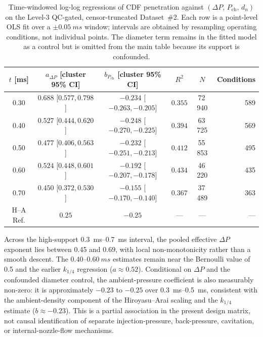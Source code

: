 \begin{table}[!ht]
\centering
\footnotesize
\setlength{\tabcolsep}{4pt}
\begin{tabular}{@{}ccccc r@{}}
\toprule
$t$ [ms] & $a_{\Delta P}$ [cluster 95\% CI] & $b_{P_{\mathrm{ch}}}$ [cluster 95\% CI] & $R^2$ & $N$ & Conditions \\
\midrule
0.30 & $0.688$ [$0.577,0.798$] & $-0.234$ [$-0.263,-0.205$] & $0.355$ & 72\,940 & 589 \\
0.40 & $0.527$ [$0.444,0.620$] & $-0.248$ [$-0.270,-0.225$] & $0.394$ & 63\,725 & 569 \\
0.50 & $0.477$ [$0.406,0.563$] & $-0.232$ [$-0.251,-0.213$] & $0.412$ & 55\,853 & 495 \\
0.60 & $0.524$ [$0.448,0.601$] & $-0.192$ [$-0.207,-0.178$] & $0.434$ & 46\,220 & 435 \\
0.70 & $0.450$ [$0.372,0.530$] & $-0.155$ [$-0.170,-0.140$] & $0.367$ & 37\,489 & 363 \\
\midrule
H--A Ref. & $0.25$ & $-0.25$ & --- & --- & --- \\
\bottomrule
\end{tabular}
\caption{Time-windowed log-log regressions of CDF penetration against $(\Delta P,\,P_{\mathrm{ch}},\,d_n)$ on the Level-3 QC-gated, censor-truncated Dataset~\#2. Each row is a point-level OLS fit over a $\pm\SI{0.05}{ms}$ window; intervals are obtained by resampling operating conditions, not individual points. The diameter term remains in the fitted model as a control but is omitted from the main table because its support is confounded.}
\label{tab:loglog-regression-uncensored}
\end{table}

Across the high-support \SIrange{0.3}{0.7}{ms} interval, the pooled effective \(\Delta P\) exponent lies between 0.45 and 0.69, with local non-monotonicity rather than a smooth descent. The \(0.40\)--\(\SI{0.60}{ms}\) estimates remain near the Bernoulli value of 0.5 and the earlier \(k_{1/4}\) regression (\(a\approx0.52\)). Conditional on \(\Delta P\) and the confounded diameter control, the ambient-pressure coefficient is also measurably non-zero: it is approximately \(-0.23\) to \(-0.25\) over \SIrange{0.3}{0.5}{ms}, consistent with the ambient-density component of the Hiroyasu--Arai scaling and the \(k_{1/4}\) estimate (\(b\approx-0.23\)). This is a partial association in the present design matrix, not causal identification of separate injection-pressure, back-pressure, cavitation, or internal-nozzle-flow mechanisms.

